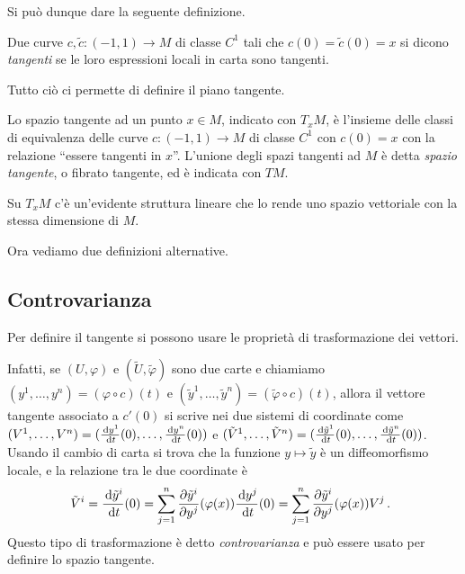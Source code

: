 Si può dunque dare la seguente definizione.
 
\begin{definition} 
	Due curve $c,\tilde{c}:(-1,1)\to M$ di classe $C^1$ tali che $c(0)=\tilde{c}(0)=x$ si dicono \emph{tangenti} se le loro espressioni locali in carta sono tangenti.
\end{definition}

Tutto ciò ci permette di definire il piano tangente.
 
\begin{definition}  
	Lo spazio tangente ad un punto $x\in M$, indicato con $T_xM$, è l'insieme delle classi di equivalenza delle curve $c:(-1,1)\to M$ di classe $C^1$ con $c(0)=x$ con la relazione ``essere tangenti in $x$''. L'unione degli spazi tangenti ad $M$ è detta \emph{spazio tangente}, o fibrato tangente, ed è indicata con $TM$.
\end{definition}
 
 \begin{remark}
  Su $T_xM$ c'è un'evidente struttura lineare che lo rende uno spazio vettoriale con la
  stessa dimensione di $M$.
 \end{remark}

Ora vediamo due definizioni alternative.
 
\subsection{Controvarianza}
Per definire il tangente si possono usare le proprietà di trasformazione dei vettori.

Infatti, se $(U,\varphi)$ e $(\tilde{U},\tilde{\varphi})$ sono due carte e chiamiamo $(y^1,\dots,y^n)=(\varphi\circ c)(t)$ e $(\tilde{y}^1,\dots,\tilde{y}^n)=(\tilde{\varphi}\circ c)(t)$, allora il vettore tangente associato a $c'(0)$ si scrive nei due sistemi di coordinate come $(V^1,\dots,V^n)=(\frac{\,\mathrm d y^1}{\,\mathrm d t}(0),\dots,\frac{\,\mathrm d y^n}{\,\mathrm d t}(0))$ e $(\tilde{V}^1,\dots,\tilde{V}^n)=(\frac{\,\mathrm d\tilde{y}^1}{\,\mathrm d t}(0),\dots,\frac{\,\mathrm d\tilde{y}^n}{\,\mathrm d t}(0))$.
Usando il cambio di carta si trova che la funzione $y\mapsto\tilde{y}$ è un diffeomorfismo locale, e la relazione tra le due coordinate è 
\begin{equation*}
	\tilde{V}^i=\frac{\,\mathrm d\tilde{y}^i}{\,\mathrm d t}(0)=\sum_{j=1}^n\frac{\partial\tilde{y}^i}{\partial y^j}(\varphi(x)) \frac{\,\mathrm d y^j}{\,\mathrm d t}(0)=\sum_{j=1}^n\frac{\partial\tilde{y}^i}{\partial y^j}(\varphi(x))V^j\, \text{. }
\end{equation*}
Questo tipo di trasformazione è detto \emph{controvarianza} e può essere usato per definire lo spazio tangente. 

